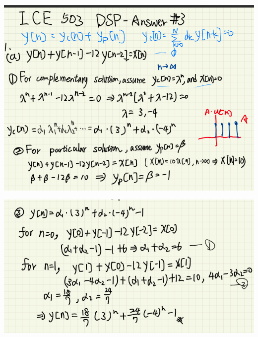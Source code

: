 \documentclass[a4paper]{article}
\begin{document}
\newpage

	
	\begin{center}
		\includegraphics[width=1\linewidth]{screenshot020}
	\end{center}
	
	\begin{center}
		\includegraphics[width=1\linewidth]{screenshot021}
	\end{center}
		
\end{document}
